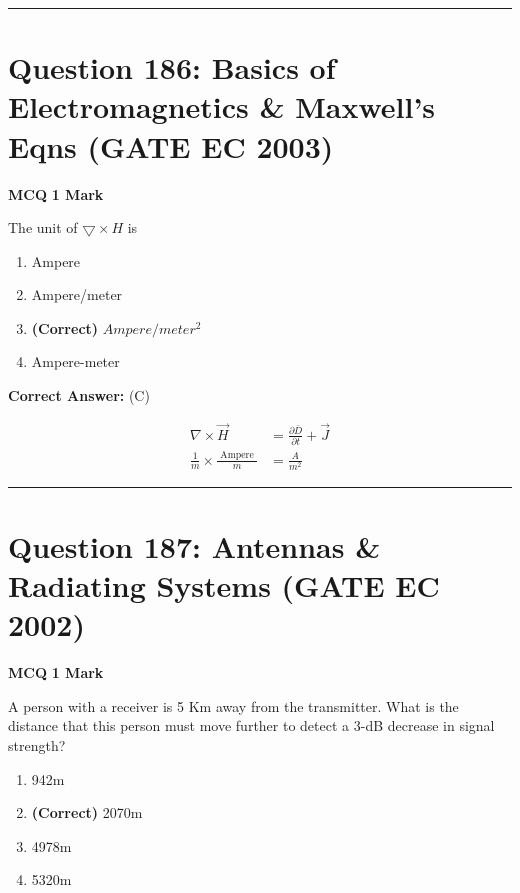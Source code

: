 \documentclass[11pt,a4paper]{article}
\begin{document}
\vspace{1.5em}
\hrule
\vspace{1.5em}

\section*{Question 186: Basics of Electromagnetics \& Maxwell's Eqns (GATE EC 2003)}
\noindent \textbf{\color{primary}MCQ} \hfill \textbf{\color{secondary}1 Mark}


\noindent The unit of $\bigtriangledown \times H$ is


\begin{enumerate}[label=(\Alph*)]
    \item Ampere
    \item Ampere/meter
    \item \textbf{(Correct)} $Ampere/meter^{2}$
    \item Ampere-meter
\end{enumerate}

\noindent \textbf{Correct Answer:} (C)

\begin{tcolorbox}[solbox, title=Detailed Solution -- Question 186]
\[
\begin{aligned} \nabla \times \vec{H} &=\frac{\partial \bar{D}}{\partial t}+\vec{J} \\ \frac{1}{m} \times \frac{\text { Ampere }}{m} &=\frac{A}{m^{2}} \end{aligned}
\]
\end{tcolorbox}

\vspace{1.5em}
\hrule
\vspace{1.5em}

\section*{Question 187: Antennas \& Radiating Systems (GATE EC 2002)}
\noindent \textbf{\color{primary}MCQ} \hfill \textbf{\color{secondary}1 Mark}


\noindent A person with a receiver is 5 Km away from the transmitter. What is the distance
that this person must move further to detect a 3-dB decrease in signal strength?


\begin{enumerate}[label=(\Alph*)]
    \item 942m
    \item \textbf{(Correct)} 2070m
    \item 4978m
    \item 5320m
\end{enumerate}
\end{document}
